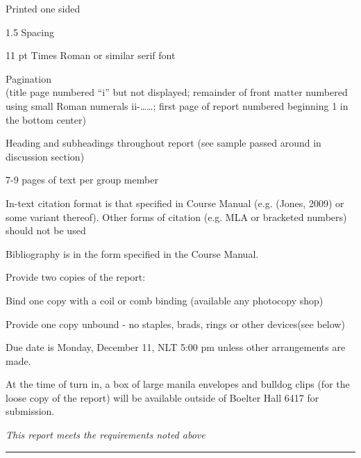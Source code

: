 \documentclass[11pt, titlepage]{article}
\begin{document}
\begin{todolist}
    \item Printed one sided
    \item 1.5 Spacing
    \item 11 pt Times Roman or similar serif font
    \item Pagination\\
    (title page numbered ``i'' but not displayed; remainder of front
    matter numbered using small Roman numerals ii-……; first page of report
    numbered beginning 1 in the bottom center)
    \item Heading and subheadings throughout report (see sample passed around in
    discussion section)
    \item 7-9 pages of text per group member
    \item In-text citation format is that specified in Course Manual (e.g. (Jones,
    2009) or some variant thereof). Other forms of citation (e.g. MLA or bracketed
    numbers) should not be used
    \item Bibliography is in the form specified in the Course Manual.
    \item Provide two copies of the report:
    \begin{todolist}
        \item Bind one copy with a coil or comb binding (available any photocopy
        shop)
        \item Provide one copy unbound - no staples, brads, rings or other
        devices(see below)
    \end{todolist}
    \item Due date is Monday, December 11, NLT 5:00 pm unless other arrangements are
    made.
    \item At the time of turn in, a box of large manila envelopes and bulldog clips
    (for the loose copy of the report) will be available outside of Boelter Hall
    6417 for submission.
\end{todolist}
\begin{center}
    \textit{This report meets the requirements noted above}\\
    \rule{0.5\textwidth}{1pt}
\end{center}
\end{document}
